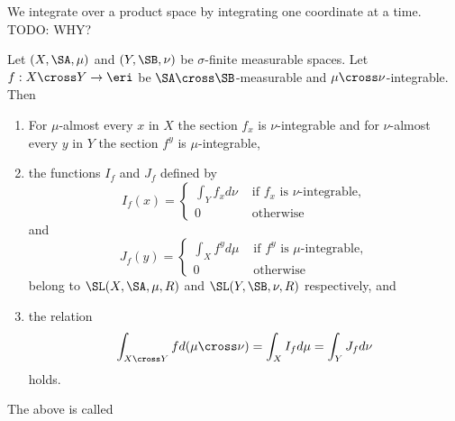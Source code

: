 \sbasic


\sstart



We integrate
over a product space
by integrating one coordinate
at a time.
TODO: WHY?


\begin{prop}
Let
$(X, \SA, \mu)$ and
$(Y, \SB, \nu)$ be
$\sigma$-finite measurable spaces.
Let $f: X \cross Y \to \eri$ be
$\SA \cross \SB$-measurable
and $\mu\cross\nu$-integrable.
Then
  \begin{enumerate}
    \item
      For $\mu$-almost every
      $x$ in $X$ the section
      $f_x$ is $\nu$-integrable
      and for $\nu$-almost every
      $y$ in $Y$ the section $f^y$
      is $\mu$-integrable,
    \item
      the functions $I_f$ and $J_f$
      defined by
      \[
        I_f(x) = \begin{cases}
          \int_{Y} f_x d\nu &\text{ if }
          f_x \text{ is } \nu\text{-integrable}, \\
          0 & \text{ otherwise}
        \end{cases}
      \]
      and
      \[
        J_f(y) = \begin{cases}
          \int_{X} f^y d\mu &\text{ if }
          f^y \text{ is } \mu\text{-integrable}, \\
          0 & \text{ otherwise}
        \end{cases}
      \]
      belong to
      $\SL(X, \SA, \mu, R)$
      and
      $\SL(Y, \SB, \nu, R)$
      respectively, and
    \item
      the relation
      \[
        \int_{X \cross Y} f d(\mu \cross \nu)
        = \int_{X} I_f d\mu = \int_{Y} J_f d\nu
      \]
      holds.
  \end{enumerate}
\end{prop}

The above is called 

\strats
